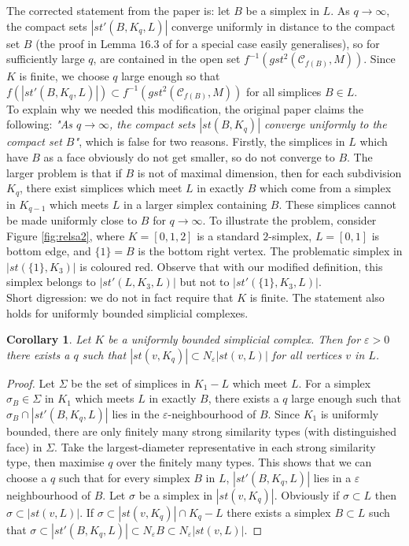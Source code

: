 \documentclass[a4paper,11pt]{article}
\theoremstyle{definition}
\theoremstyle{plain}
\newtheorem{cor}[definition]{Corollary}
\theoremstyle{remark}
\begin{document}
{The corrected statement from the paper is: let $B$ be a simplex in $L$. As $q\rightarrow \infty$, the compact sets $|st'(B,K_{q},L)|$ converge uniformly in distance to the compact set $B$ (the proof in Lemma $16.3$ of \cite{munkres2018elements} for a special case easily generalises), so for sufficiently large $q$, are contained in the open set $f^{-1}(gst^2(\mathscr{C}_{f(B)},M))$. Since $K$ is finite, we choose $q$ large enough so that $f(|st'(B,K_{q},L)|) \subset f^{-1}(gst^2(\mathscr{C}_{f(B)},M))$ for all simplices $B\in L$. \\

To explain why we needed this modification, the original paper claims the following: \textit{"As $q\rightarrow \infty$, the compact sets $|st(B,K_{q})|$ converge uniformly to the compact set $B$"}, which is false for two reasons. Firstly, the simplices in $L$ which have $B$ as a face obviously do not get smaller, so do not converge to $B$. The larger problem is that if $B$ is not of maximal dimension, then for each subdivision $K_{q}$, there exist simplices which meet $L$ in exactly $B$ which come from a simplex in $K_{q-1}$ which meets $L$ in a larger simplex containing $B$. These simplices cannot be made uniformly close to $B$ for $q\rightarrow \infty$. To illustrate the problem, consider Figure \ref{fig:relsa2}, where $K=[0,1,2]$ is a standard $2$-simplex, $L=[0,1]$ is bottom edge, and $\{1\}=B$ is the bottom right vertex. The problematic simplex in $|st(\{1\},K_{3})|$ is coloured red. Observe that with our modified definition, this simplex belongs to $|st'(L,K_{3},L)|$ but not to $|st'(\{1\},K_{3},L)|$. \\

Short digression: we do not in fact require that $K$ is finite. The statement also holds for uniformly bounded simplicial complexes.

\begin{cor} \label{starconv} Let $K$ be a uniformly bounded simplicial complex. Then for $\varepsilon>0$ there exists a $q$ such that $|st(v,K_{q})| \subset N_{\varepsilon} |st(v,L)|$ for all vertices $v$ in $L$. 
\end{cor} 

\begin{proof} 
Let $\Sigma$ be the set of simplices in $K_1-L$ which meet $L$. For a simplex $\sigma_{B}\in \Sigma$ in $K_1$ which meets $L$ in exactly $B$, there exists a $q$ large enough such that $\sigma_B \cap |st'(B,K_q,L)|$ lies in the $\varepsilon$-neighbourhood of $B$. Since $K_1$ is uniformly bounded, there are only finitely many strong similarity types (with distinguished face) in $\Sigma$. Take the largest-diameter representative in each strong similarity type, then maximise $q$ over the finitely many types. This shows that we can choose a $q$ such that for every simplex $B$ in $L$, $|st'(B,K_q,L)|$ lies in a $\varepsilon$ neighbourhood of $B$. Let $\sigma$ be a simplex in $|st(v,K_{q})|$. Obviously if $\sigma\subset L$ then $\sigma \subset |st(v,L)|$. If $\sigma \subset |st(v,K_q)|\cap K_{q}-L$ there exists a simplex $B\subset L$ such that $\sigma\subset |st'(B,K_{q},L)| \subset N_{\varepsilon} B \subset N_{\varepsilon} |st(v,L)|$.
\end{proof}



}
\end{document}
